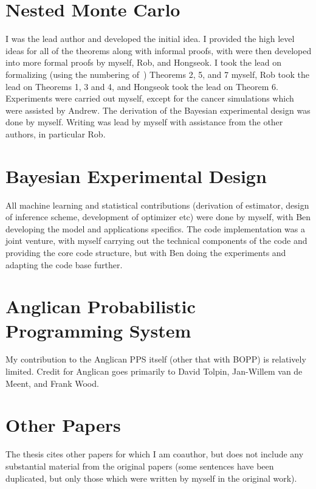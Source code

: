 \documentclass[a4paper,twoside,12pt]{article}
\begin{document}
\section{Nested Monte Carlo}

\textit{}

\textit{}

I was the lead author and developed the initial idea.  I provided the high level ideas for all of the theorems along with
informal proofs, with were then developed into more formal proofs by myself, Rob, and Hongseok.  I took the
lead on formalizing (using the numbering of~\cite{rainforth2017pitfalls}) Theorems 2, 5, and 7 myself, Rob took the lead on Theorems 1, 3 and 4, and
Hongseok took the lead on Theorem 6.  Experiments were carried out myself, except for the cancer simulations which were assisted by Andrew.
The derivation of the Bayesian experimental design was done by myself.  Writing was lead by myself with assistance from
the other authors, in particular Rob.

\section{Bayesian Experimental Design}

\textit{}

All machine learning and statistical contributions (derivation of estimator, design of inference scheme, development of
optimizer etc) were done by myself, with Ben developing the model and applications specifics.  The code implementation
was a joint venture, with myself carrying out the technical components of the code and providing the core code structure,
but with Ben doing the experiments and adapting the code base further.

\section{Anglican Probabilistic Programming System}

My contribution to the Anglican PPS itself (other that with BOPP) is relatively limited.  Credit for Anglican goes primarily
to David Tolpin, Jan-Willem van de Meent, and Frank Wood.

\section{Other Papers}

The thesis cites other papers for which I am coauthor, but does not include any substantial material from
the original papers (some sentences have been duplicated, but only those which were written by myself in the original work).
%
%
%
%

\end{document}
